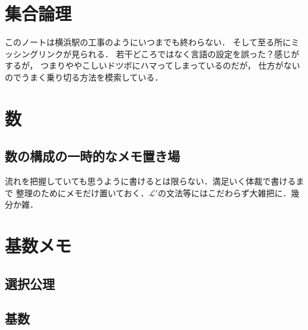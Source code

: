 \documentclass[a4j,10.5pt,oneside,openany]{jsbook}
\theoremstyle{mystyle}
\begin{document}
\appendix
\chapter{集合論理}
	このノートは横浜駅の工事のようにいつまでも終わらない．
	そして至る所にミッシングリンクが見られる．
	若干どころではなく言語の設定を誤った？感じがするが，
	つまりややこしいドツボにハマってしまっているのだが，
	仕方がないのでうまく乗り切る方法を模索している．
	\label{sec:logic_and_set_theory}
	
	
	
	
	
	
	
	
	
	
	
	
	

\chapter{数}
	
	
	\section{数の構成の一時的なメモ置き場}
		流れを把握していても思うように書けるとは限らない．満足いく体裁で書けるまで
		整理のためにメモだけ置いておく．$\mathcal{L}'$の文法等にはこだわらず大雑把に．幾分か雑．
		
		
		
	
	
	
	
	
	
	
	
	
\chapter{基数メモ}
	\section{選択公理}
		
	\section{基数}
		
		
\end{document}
